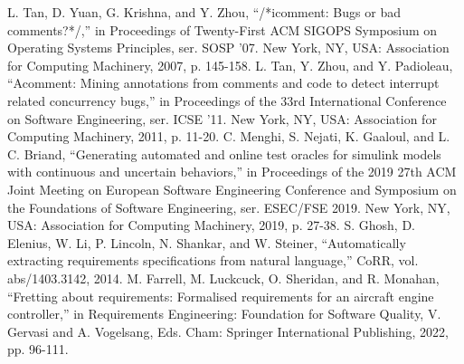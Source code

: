 \documentclass[uplatex, twocolumn, 10pt]{jsarticle} %
\begin{document}
\begin{thebibliography}{99}
     L. Tan, D. Yuan, G. Krishna, and Y. Zhou, “/*icomment: Bugs or bad comments?*/,” in Proceedings of Twenty-First ACM SIGOPS Symposium on Operating Systems Principles, ser. SOSP '07. New York, NY, USA: Association for Computing Machinery, 2007, p. 145-158.
     L. Tan, Y. Zhou, and Y. Padioleau, “Acomment: Mining annotations from comments and code to detect interrupt related concurrency bugs,” in Proceedings of the 33rd International Conference on Software Engineering, ser. ICSE '11. New York, NY, USA: Association for Computing Machinery, 2011, p. 11-20.
     C. Menghi, S. Nejati, K. Gaaloul, and L. C. Briand, “Generating automated and online test oracles for simulink models with continuous and uncertain behaviors,” in Proceedings of the 2019 27th ACM Joint Meeting on European Software Engineering Conference and Symposium on the Foundations of Software Engineering, ser. ESEC/FSE 2019. New York, NY, USA: Association for Computing Machinery, 2019, p. 27-38.
     S. Ghosh, D. Elenius, W. Li, P. Lincoln, N. Shankar, and W. Steiner, “Automatically extracting requirements specifications from natural language,” CoRR, vol. abs/1403.3142, 2014.
     M. Farrell, M. Luckcuck, O. Sheridan, and R. Monahan, “Fretting about requirements: Formalised requirements for an aircraft engine controller,” in Requirements Engineering: Foundation for Software Quality, V. Gervasi and A. Vogelsang, Eds. Cham: Springer International Publishing, 2022, pp. 96-111.
\end{thebibliography}
\end{document}
